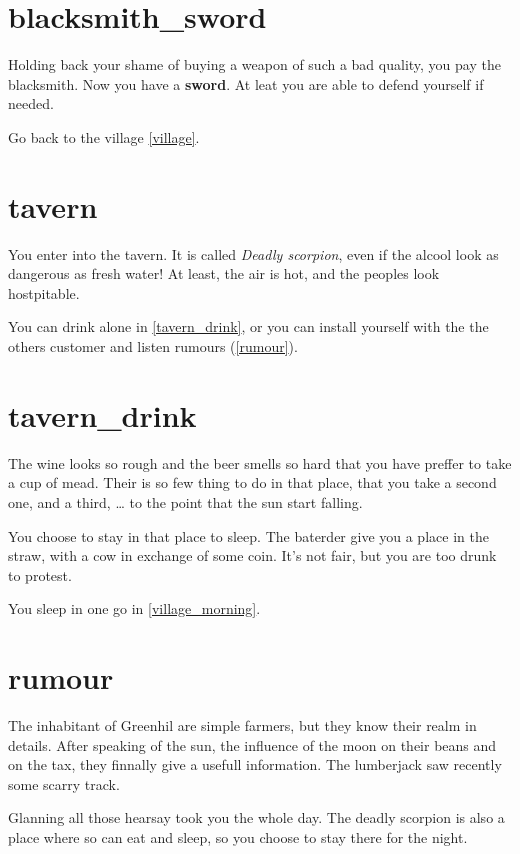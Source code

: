 \section{blacksmith_sword}

Holding back your shame of buying a weapon of such a bad quality, you pay the
blacksmith. Now you have a \textbf{sword}. At leat you are able to defend
yourself if needed.

Go back to the village \ref{village}.

\section{tavern}

You enter into the tavern. It is called \textit{Deadly scorpion}, even if the
alcool look as dangerous as fresh water! At least, the air is hot, and the
peoples look hostpitable.

You can drink alone in \ref{tavern_drink}, or you can install yourself with the
the others customer and listen rumours (\ref{rumour}).

\section{tavern_drink}

The wine looks so rough and the beer smells so hard that you have preffer to
take a cup of mead. Their is so few thing to do in that place, that you take a
second one, and a third, … to the point that the sun start falling.

You choose to stay in that place to sleep. The baterder give you a place in the
straw, with a cow in exchange of some coin. It's not fair, but you are too drunk
to protest.

You sleep in one go in \ref{village_morning}.

\section{rumour}

The inhabitant of Greenhil are simple farmers, but they know their realm in
details. After speaking of the sun, the influence of the moon on their beans and
on the tax, they finnally give a usefull information. The lumberjack saw
recently some scarry track.

Glanning all those hearsay took you the whole day. The deadly scorpion is also a
place where so can eat and sleep, so you choose to stay there for the night.

